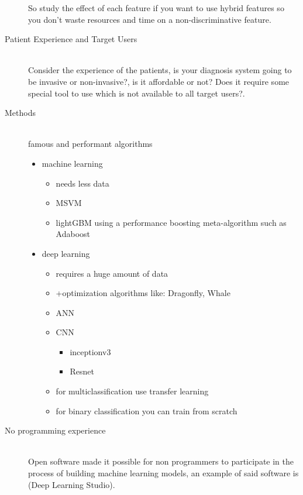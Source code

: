 \begin{description}
            So study the effect of each feature if you want to use hybrid features so you don't waste resources and time on a non-discriminative feature. 
        \item[Patient Experience and Target Users] \hfill \\ 
            Consider the experience of the patients,
            is your diagnosis system going to be invasive or non-invasive?, is it affordable or not? Does it require some special tool to use which is not available to all target users?.
        \item[Methods] \hfill \\
            famous and performant algorithms
            \begin{itemize}
            \item machine learning 
                \begin{itemize}
                    \item needs less data
                    \item MSVM
                    \item lightGBM using a performance boosting meta-algorithm such as Adaboost 
                \end{itemize}
            \item deep learning 
                \begin{itemize}
                    \item requires a huge amount of data
                    \item +optimization algorithms like: Dragonfly, Whale
                    \item ANN
                    \item CNN
                    \begin{itemize}
                        \item inceptionv3
                        \item Resnet
                    \end{itemize}
                    \item for multiclassification use transfer learning
                    \item for binary classification you can train from scratch
                \end{itemize}
            \end{itemize}
        \item[No programming experience] \hfill \\
            Open software made it possible for non programmers to participate in the process of building machine learning models, an example of said software is (Deep Learning Studio).

\end{description}
